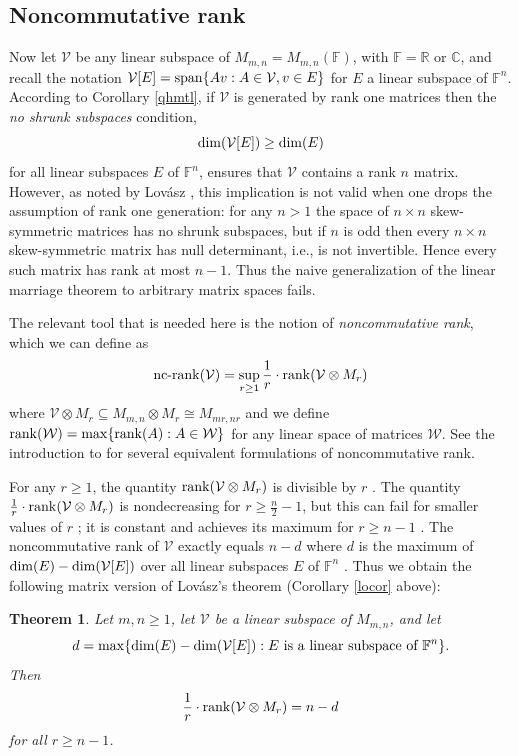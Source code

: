 \documentclass{amsart}
\newtheorem{thm}{Theorem}[section]
\theoremstyle{definition}
\newcommand\ncrank{\operatorname{nc-rank}}
\begin{document}
\subsection{Noncommutative rank}

Now let $\mathcal{V}$ be any linear subspace of $M_{m,n} = M_{m,n}(\mathbb{F})$, with $\mathbb{F} = \mathbb{R}$ or $\mathbb{C}$, and recall the notation $\mathcal{V}[E] = {\rm span}\{Av: A \in \mathcal{V}, v \in E\}$ for $E$ a linear subspace of $\mathbb{F}^n$. According to Corollary \ref{qhmtl}, if $\mathcal{V}$ is generated by rank one matrices then the {\it no shrunk subspaces} condition, $${\rm dim}(\mathcal{V}[E]) \geq {\rm dim}(E)$$ for all linear subspaces $E$ of $\mathbb{F}^n$, ensures that $\mathcal{V}$ contains a rank $n$ matrix. However, as noted by Lovász \cite{lovasz}, this implication is not valid when one drops the assumption of rank one generation: for any $n > 1$ the space of $n\times n$ skew-symmetric matrices has no shrunk subspaces, but if $n$ is odd then every $n \times n$ skew-symmetric matrix has null determinant, i.e., is not invertible. Hence every such matrix has rank at most $n - 1$. Thus the naive generalization of the linear marriage theorem to arbitrary matrix spaces fails.

The relevant tool that is needed here is the notion of {\it noncommutative rank}, which we can define as $$\ncrank(\mathcal{V}) = \sup_{r \geq 1} \frac{1}{r} \cdot {\rm rank}(\mathcal{V} \otimes M_r)$$ where $\mathcal{V}\otimes M_r \subseteq M_{m,n}\otimes M_r \cong M_{mr,nr}$ and we define ${\rm rank}(\mathcal{W}) = \max\{{\rm rank}(A): A \in \mathcal{W}\}$ for any linear space of matrices $\mathcal{W}$. See the introduction to \cite{IQS} for several equivalent formulations of noncommutative rank.

For any $r \geq 1$, the quantity ${\rm rank}(\mathcal{V} \otimes M_r)$ is divisible by $r$ \cite[Lemma 5.6]{IQS0}. The quantity $\frac{1}{r}\cdot {\rm rank}(\mathcal{V} \otimes M_r)$ is nondecreasing for $r \geq \frac{n}{2} - 1$, but this can fail for smaller values of $r$ \cite[Propositions 1.12 and 1.13]{DM1}; it is constant and achieves its maximum for $r \geq n -1$ \cite[Theorem 1.8]{DM}. The noncommutative rank of $\mathcal{V}$ exactly equals $n - d$ where $d$ is the maximum of ${\rm dim}(E) - {\rm dim}(\mathcal{V}[E])$ over all linear subspaces $E$ of $\mathbb{F}^n$ \cite[Theorem 1]{FR}. Thus we obtain the following matrix version of Lovász's theorem (Corollary \ref{locor} above):

\begin{thm}\label{ncr}
Let $m,n \geq 1$, let $\mathcal{V}$ be a linear subspace of $M_{m,n}$, and let $$d = {\rm max}\{{\rm dim}(E) - {\rm dim}(\mathcal{V}[E]): E\mbox{ is a linear subspace of }\mathbb{F}^n\}.$$ Then $$\frac{1}{r}\cdot {\rm rank}(\mathcal{V}\otimes M_r) = n - d$$ for all $r \geq n-1$.
\end{thm}
\end{document}
